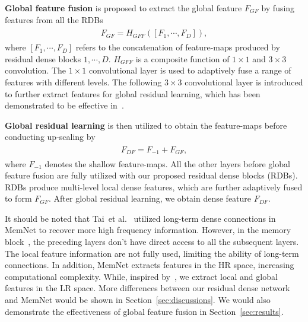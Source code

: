 \documentclass[10pt,twocolumn,letterpaper]{article}
\begin{document}
\textbf{Global feature fusion} is proposed to extract the global feature $F_{GF}$ by fusing features from all the RDBs
\begin{align}
\begin{split}
\label{eq:GFF}
F_{GF}=H_{GFF}\left ( \left [ F_{1},\cdots ,F_{D} \right ] \right ),
\end{split}
\end{align}
where $\left [ F_{1},\cdots ,F_{D} \right ]$ refers to the concatenation of feature-maps produced by residual dense blocks $1,\cdots ,D$. $H_{GFF}$ is a composite function of $1\times 1$ and $3\times 3$ convolution. The $1\times 1$ convolutional layer is used to adaptively fuse a range of features with different levels. The following $3\times 3$ convolutional layer is introduced to further extract features for global residual learning, which has been demonstrated to be effective in~\cite{ledig2017photo}.

\textbf{Global residual learning} is then utilized to obtain the feature-maps before conducting up-scaling by 
\begin{align}
\begin{split}
\label{eq:DFF_GF}
F_{DF}=F_{-1}+F_{GF},
\end{split}
\end{align}
where $F_{-1}$ denotes the shallow feature-maps. All the other layers before global feature fusion are fully utilized with our proposed residual dense blocks (RDBs). RDBs produce multi-level local dense features, which are further adaptively fused to form $F_{GF}$. After global residual learning, we obtain dense feature $F_{DF}$.

It should be noted that Tai~et al.~\cite{tai2017memnet} utilized long-term dense connections in MemNet to recover more high frequency information. However, in the memory block~\cite{tai2017memnet}, the preceding layers don't have direct access to all the subsequent layers. The local feature information are not fully used, limiting the ability of long-term connections. In addition, MemNet extracts features in the HR space, increasing computational complexity. While, inspired by~\cite{dong2016accelerating,shi2016real,lai2017deep,lim2017enhanced}, we extract local and global features in the LR space. More differences between our residual dense network and MemNet would be shown in Section~\ref{sec:discussions}. We would also demonstrate the effectiveness of global feature fusion in Section~\ref{sec:results}.
\end{document}
